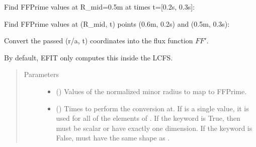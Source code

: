 \documentclass[letterpaper,10pt,english]{sphinxmanual}
\begin{document}
\begin{fulllineitems}
\begin{fulllineitems}
Find FFPrime values at R\_mid=0.5m at times t={[}0.2s, 0.3s{]}:

\begin{sphinxVerbatim}[commandchars=\\\{\}]
   \PYG{p}{[} \PYG{p}{]}
\end{sphinxVerbatim}

Find FFPrime values at (R\_mid, t) points (0.6m, 0.2s) and (0.5m, 0.3s):

\begin{sphinxVerbatim}[commandchars=\\\{\}]
  \PYG{p}{[} \PYG{p}{]} \PYG{p}{[} \PYG{p}{]} 
\end{sphinxVerbatim}

\end{fulllineitems}


\begin{fulllineitems}
\label{\detokenize{eqtools:eqtools.core.Equilibrium.roa2FFPrime}}
Convert the passed (r/a, t) coordinates into the flux function \(FF'\).

By default, EFIT only computes this inside the LCFS.
\begin{quote}\begin{description}
\item[{Parameters}] \leavevmode\begin{itemize}
\item {} 
 () \textendash{} Values of the normalized minor
radius to map to FFPrime.

\item {} 
 () \textendash{} Times to perform the conversion at.
If  is a single value, it is used for all of the elements of
. If the  keyword is True, then  must be scalar
or have exactly one dimension. If the  keyword is False,
 must have the same shape as .


\end{itemize}
\end{description}
\end{quote}
\end{fulllineitems}
\end{fulllineitems}
\end{document}
